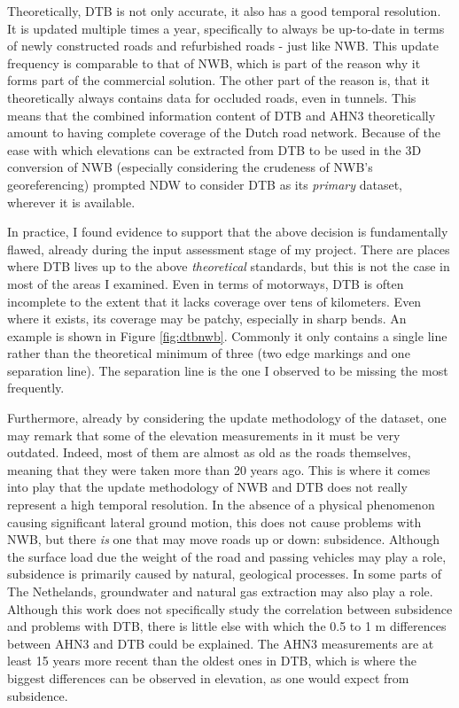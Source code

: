 Theoretically, DTB is not only accurate, it also has a good temporal resolution. It is updated multiple times a year, specifically to always be up-to-date in terms of newly constructed roads and refurbished roads - just like NWB. This update frequency is comparable to that of NWB, which is part of the reason why it forms part of the commercial solution. The other part of the reason is, that it theoretically always contains data for occluded roads, even in tunnels. This means that the combined information content of DTB and AHN3 theoretically amount to having complete coverage of the Dutch road network. Because of the ease with which elevations can be extracted from DTB to be used in the 3D conversion of NWB (especially considering the crudeness of NWB's georeferencing) prompted NDW to consider DTB as its \textit{primary} dataset, wherever it is available.

In practice, I found evidence to support that the above decision is fundamentally flawed, already during the input assessment stage of my project. There are places where DTB lives up to the above \textit{theoretical} standards, but this is not the case in most of the areas I examined. Even in terms of motorways, DTB is often incomplete to the extent that it lacks coverage over tens of kilometers. Even where it exists, its coverage may be patchy, especially in sharp bends. An example is shown in Figure \ref{fig:dtbnwb}. Commonly it only contains a single line rather than the theoretical minimum of three (two edge markings and one separation line). The separation line is the one I observed to be missing the most frequently.

Furthermore, already by considering the update methodology of the dataset, one may remark that some of the elevation measurements in it must be very outdated. Indeed, most of them are almost as old as the roads themselves, meaning that they were taken more than 20 years ago. This is where it comes into play that the update methodology of NWB and DTB does not really represent a high temporal resolution. In the absence of a physical phenomenon causing significant lateral ground motion, this does not cause problems with NWB, but there \textit{is} one that may move roads up or down: subsidence. Although the surface load due the weight of the road and passing vehicles may play a role, subsidence is primarily caused by natural, geological processes. In some parts of The Nethelands, groundwater and natural gas extraction may also play a role. Although this work does not specifically study the correlation between subsidence and problems with DTB, there is little else with which the 0.5 to 1 m differences between AHN3 and DTB could be explained. The AHN3 measurements are at least 15 years more recent than the oldest ones in DTB, which is where the biggest differences can be observed in elevation, as one would expect from subsidence.

